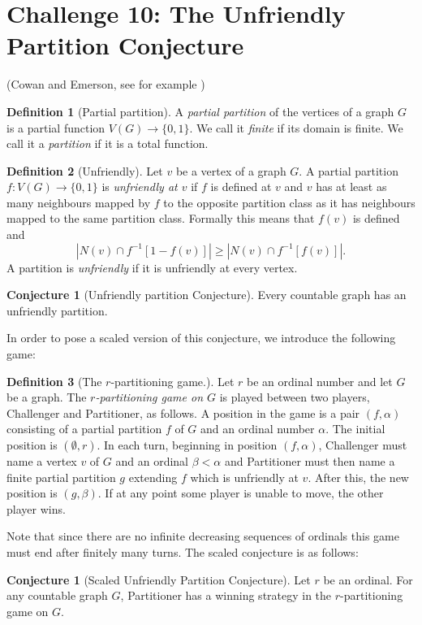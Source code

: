 \documentclass[12pt]{article}
\numberwithin{equation}{section}
\theoremstyle{definition}
\newtheorem{definition}{Definition}
\newtheorem{conjecture}[theorem]{Conjecture}
\begin{document}
\section*{Challenge 10: The Unfriendly Partition Conjecture}

(Cowan and Emerson, see for example \cite{aharoni1990unfriendly})

\begin{definition}[Partial partition]
A {\em partial partition} of the vertices of a graph $G$ is a partial function $V(G) \to \{0,1\}$. We call it {\em finite} if its domain is finite. We call it a {\em partition} if it is a total function.
\end{definition}

\begin{definition}[Unfriendly]
Let $v$ be a vertex of a graph $G$. A partial partition $f \colon V(G) \to \{0,1\}$ is {\em unfriendly at $v$} if $f$ is defined at $v$ and $v$ has at least as many neighbours mapped by $f$ to the opposite partition class as it has neighbours mapped to the same partition class. Formally this means that $f(v)$ is defined and
$$|N(v) \cap f^{-1}[1 - f(v)]| \ge |N(v) \cap f^{-1}[f(v)]|.$$
A partition is {\em unfriendly} if it is unfriendly at every vertex.
\end{definition}

\begin{conjecture}[Unfriendly partition Conjecture]
Every countable graph has an unfriendly partition.
\end{conjecture}

In order to pose a scaled version of this conjecture, we introduce the following game:

\begin{definition}[The $r$-partitioning game.]
Let $r$ be an ordinal number and let $G$ be a graph. The {\em $r$-partitioning game on $G$} is played between two players, Challenger and Partitioner, as follows. A position in the game is a pair $(f, \alpha)$ consisting of a partial partition $f$ of $G$ and an ordinal number $\alpha$. The initial position is $(\emptyset, r)$. In each turn, beginning in position $(f, \alpha)$, Challenger must name a vertex $v$ of $G$ and an ordinal $\beta < \alpha$ and Partitioner must then name a finite partial partition $g$ extending $f$ which is unfriendly at $v$. After this, the new position is $(g, \beta)$. If at any point some player is unable to move, the other player wins.
\end{definition}

Note that since there are no infinite decreasing sequences of ordinals this game must end after finitely many turns. The scaled conjecture is as follows:

\begin{conjecture}[Scaled Unfriendly Partition Conjecture]
Let $r$ be an ordinal. For any countable graph $G$, Partitioner has a winning strategy in the $r$-partitioning game on $G$.
\end{conjecture}

\printbibliography
\end{document}
